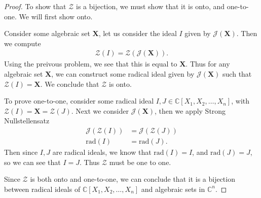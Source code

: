 \documentclass[10pt]{amsart}
\newcommand{\C}{\mathbb{C}}
\newcommand{\rad}[1]{\text{rad}\left(#1\right)}
\newenvironment{claim}[1]{\par\noindent\textit{Claim:}\space#1}{}
\begin{document}
\begin{proof}
  To show that $\mathscr{Z}$ is a bijection, we must show that it is onto, and
  one-to-one. We will first show onto.

  Consider some algebraic set $\mathbf{X}$, let us consider the ideal $I$ given
  by $\mathscr{J}(\mathbf{X})$. Then we compute
  \begin{align*}
    \mathscr{Z}(I)=\mathscr{Z}(\mathscr{J}(\mathbf{X})).
  \end{align*}
  Using the preivous problem, we see that this is equal to $\mathbf{X}$. Thus
  for any algebraic set $\mathbf{X}$, we can construct some radical ideal given
  by $\mathscr{J}(\mathbf{X})$ such that $\mathscr{Z}(I)=\mathbf{X}$. We
  conclude that $\mathscr{Z}$ is onto.

  To prove one-to-one, consider some radical ideal
  $I,J\in\C[X_1,X_2,\ldots,X_n]$, with $\mathscr{Z}(I)=\mathbf{X} =
  \mathscr{Z}(J)$. Next we consider $\mathscr{J}(\mathbf{X})$, then we apply
  Strong Nullstellensatz
  \begin{align*}
    \mathscr{J}(\mathscr{Z}(I))&=\mathscr{J}(\mathscr{Z}(J))\\
    \rad{I}&=\rad{J}.
  \end{align*}
  Then since $I,J$ are radical ideals, we know that $\rad{I}=I$, and
  $\rad{J}=J$, so we can see that $I=J$. Thus $\mathscr{Z}$ must be one to one.

  Since $\mathscr{Z}$ is both onto and one-to-one, we can conclude that it is a
  bijection between radical ideals of $\C[X_1,X_2,\ldots,X_n]$ and algebraic
  sets in $\C^n$.
\end{proof}
\end{document}

